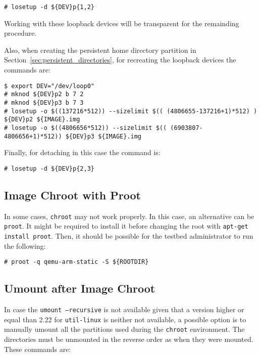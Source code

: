 \begin{lstlisting}[]
# losetup -d ${DEV}p{1,2}
\end{lstlisting}
\FloatBarrier
\vspace{-5mm}

Working with these loopback devices will be transparent for the remainding
procedure.

Also, when creating the persistent home directory partition in
Section~\ref{sec:persistent_directories}, for recreating the loopback devices
the commands are:

\begin{lstlisting}[]
$ export DEV="/dev/loop0"
# mknod ${DEV}p2 b 7 2
# mknod ${DEV}p3 b 7 3
# losetup -o $((137216*512)) --sizelimit $(( (4806655-137216+1)*512) ) ${DEV}p2 ${IMAGE}.img
# losetup -o $((4806656*512)) --sizelimit $(( (6903807-4806656+1)*512)) ${DEV}p3 ${IMAGE}.img
\end{lstlisting}
\FloatBarrier
\vspace{-5mm}

Finally, for detaching in this case the command is:
\begin{lstlisting}[]
# losetup -d ${DEV}p{2,3}
\end{lstlisting}
\FloatBarrier
\vspace{-5mm}

\subsection{Image Chroot with Proot}
\label{sec:chroot}

In some cases, \texttt{chroot} may not work properly. In this case, an
alternative can be \texttt{proot}. It might be required to install it
before changing the root with \texttt{apt-get install proot}. Then, it
should be possible for the testbed administrator to run the following:

\begin{lstlisting}[]
# proot -q qemu-arm-static -S ${ROOTDIR}
\end{lstlisting}
\FloatBarrier
\vspace{-5mm}


\subsection{Umount after Image Chroot}
\label{sec:umount}

In case the \texttt{umount --recursive} is not available given that a version
higher or equal than 2.22 for \texttt{util-linux} is neither not available,
a possible option is to manually umount all the partitions used during the
\texttt{chroot} environment. The directories must be unmounted in the reverse
order as when they were mounted. These commands are:

